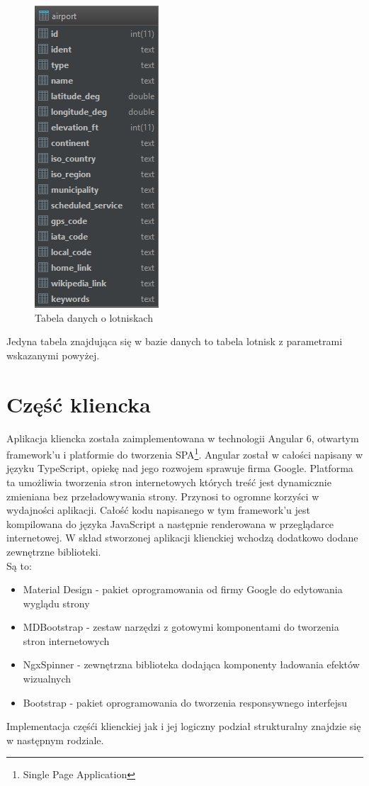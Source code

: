 \documentclass[12pt, twoside]{report}
\begin{document}
\begin{figure}[!ht]
\centering
\includegraphics[scale=0.80, keepaspectratio]{database.png}
\caption{Tabela danych o lotniskach}
\label{fig:database}
\end{figure}
Jedyna tabela znajdująca się w bazie danych to tabela lotnisk z parametrami wskazanymi powyżej.

\section{Część kliencka}
Aplikacja kliencka została zaimplementowana w technologii Angular 6, otwartym framework'u i platformie do tworzenia SPA\footnote{Single Page Application}. Angular został w całości napisany w języku TypeScript, opiekę nad jego rozwojem sprawuje firma Google. Platforma ta umożliwia tworzenia stron internetowych których treść jest dynamicznie zmieniana bez przeładowywania strony. Przynosi to ogromne korzyści w wydajności aplikacji. Całość kodu napisanego w tym framework'u jest kompilowana do języka JavaScript a następnie renderowana w przeglądarce internetowej. W skład stworzonej aplikacji klienckiej wchodzą dodatkowo dodane zewnętrzne biblioteki.\\ Są to: 
\begin{itemize}[noitemsep,topsep=0pt]
\item Material Design - pakiet oprogramowania od firmy Google do edytowania wyglądu strony
\item MDBootstrap - zestaw narzędzi z gotowymi komponentami do tworzenia stron internetowych
\item NgxSpinner - zewnętrzna biblioteka dodająca komponenty ładowania efektów wizualnych
\item Bootstrap - pakiet oprogramowania do tworzenia responsywnego interfejsu
\end{itemize}
Implementacja częśći klienckiej jak i jej logiczny podział strukturalny znajdzie się w następnym rodziale.
\newpage
\end{document}
